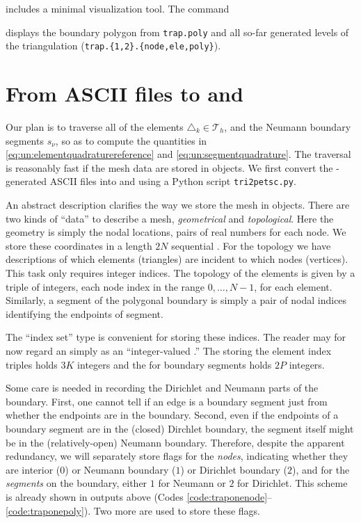 \Triangle includes a minimal visualization tool.  The command
displays the boundary polygon from \texttt{trap.poly} and all so-far generated levels of the triangulation (\texttt{trap.\{1,2\}.\{node,ele,poly\}}).


\section{From ASCII files to \PETSc \pVecs and \pISs}

Our plan is to traverse all of the elements $\triangle_k \in {}_h$, and the Neumann boundary segments $s_\nu$, so as to compute the quantities in \eqref{eq:un:elementquadraturereference} and \eqref{eq:un:segmentquadrature}.  The traversal is reasonably fast if the mesh data are stored in \PETSc objects.  We first convert the \Triangle-generated ASCII files into \pVecs and \pISs using a Python script \texttt{tri2petsc.py}.

An abstract description clarifies the way we store the mesh in \PETSc objects.  There are two kinds of ``data'' to describe a mesh, \emph{geometrical} and \emph{topological}.  Here the geometry is simply the nodal locations, pairs of real numbers for each node.  We store these coordinates in a length $2N$ sequential \pVec.  For the topology we have descriptions of which elements (triangles) are incident to which nodes (vertices).  This task only requires integer indices.  The topology of the elements is given by a triple of integers, each node index in the range $0,\dots,N-1$, for each element.  Similarly, a segment of the polygonal boundary is simply a pair of nodal indices identifying the endpoints of segment.

The \PETSc \pIS ``index set'' type is convenient for storing these indices.  The reader may for now regard an \pIS simply as an ``integer-valued \pVec.''  The \pIS storing the element index triples holds $3K$ integers and the \pIS for boundary segments holds $2P$ integers.

Some care is needed in recording the Dirichlet and Neumann parts of the boundary.  First, one cannot tell if an edge is a boundary segment just from whether the endpoints are in the boundary.  Second, even if the endpoints of a boundary segment are in the (closed) Dirchlet boundary, the segment itself might be in the (relatively-open) Neumann boundary.  Therefore, despite the apparent redundancy, we will separately store flags for the \emph{nodes}, indicating whether they are interior ($0$) or Neumann boundary ($1$) or Dirichlet boundary ($2$), and for the \emph{segments} on the boundary, either $1$ for Neumann or $2$ for Dirichlet.  This scheme is already shown in \Triangle outputs above (Codes \ref{code:traponenode}--\ref{code:traponepoly}).  Two more \pISs are used to store these flags.

